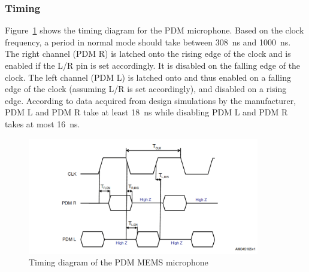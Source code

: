 \subsubsection{Timing}

Figure~\ref{fig:pdm_timing} shows the timing diagram for the PDM microphone.
Based on the clock frequency, a period in normal mode should take between \SI{308}{\nano\second} and \SI{1000}{\nano\second}.
The right channel (PDM R) is latched onto the rising edge of the clock and is enabled if the L/R pin is set accordingly.
It is disabled on the falling edge of the clock.
The left channel (PDM L) is latched onto and thus enabled on a falling edge of the clock (assuming L/R is set accordingly),
and disabled on a rising edge.
According to data acquired from design simulations by the manufacturer,
PDM L and PDM R take at least \SI{18}{\nano\second} while disabling PDM L and PDM R takes at most \SI{16}{\nano\second}.


\begin{figure}[htb]
    \centering
    \includegraphics[width=0.9\textwidth]{figures/pdm_timing.png}
    \caption[Timing diagram of the MP34DT01-M PDM MEMS mic \cite{pdm_mic_datasheet}]{Timing diagram of the PDM MEMS microphone}
    \label{fig:pdm_timing}
\end{figure}
